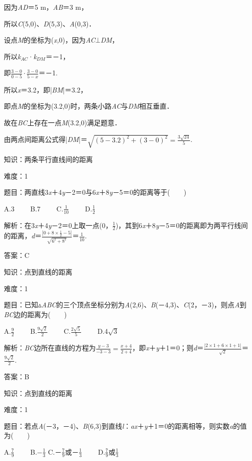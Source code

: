 \documentclass{article} %
\begin{document}
因为\textit{AD}＝5 m，\textit{AB}＝3 m，

所以\textit{C}(5,0)、\textit{D}(5,3)、\textit{A}(0,3)．

设点\textit{M}的坐标为(\textit{x,}0)，因为\textit{AC}$\mathrm{\bot}$\textit{DM}，

所以\textit{k${}_{AC}$}·\textit{k${}_{DM}$}＝－1，

即$\frac{3-0}{0-5}\cdot\frac{3-0}{5-x}$＝－1.

所以\textit{x}＝3.2，即|\textit{BM}|＝3.2，

即点\textit{M}的坐标为(3.2,0)时，两条小路\textit{AC}与\textit{DM}相互垂直．

故在\textit{BC}上存在一点\textit{M}(3.2,0)满足题意．

由两点间距离公式得|\textit{DM}|＝$\sqrt{(5-3.2)^2+(3-0)^2}=\frac{3\sqrt{24}}{5}$.


知识：两条平行直线间的距离

难度：1

题目：两直线3\textit{x}＋4\textit{y}－2＝0与6\textit{x}＋8\textit{y}－5＝0的距离等于(　　)

A.3　　 B.7　　 C.$\frac{1}{10}$　　 D.$\frac{1}{2}$

解析：在3\textit{x}＋4\textit{y}－2＝0上取一点(0，$\frac{1}{2}$)，其到6\textit{x}＋8\textit{y}－5＝0的距离即为两平行线间的距离，\textit{d}＝$\frac{|0+8\times\frac{1}{2}-5|}{\sqrt{6^2+8^2}}$＝$\frac{1}{10}$.

答案：C

知识：点到直线的距离

难度：1

题目：已知$\mathrm{\vartriangle}$\textit{ABC}的三个顶点坐标分别为\textit{A}(2,6)、\textit{B}(－4,3)、\textit{C}(2，－3)，则点\textit{A}到\textit{BC}边的距离为(　　)

A.$\frac{9}{2}$　　 B.$\frac{9\sqrt{2}}{2}$　　 C.$\frac{2\sqrt{5}}{5}$　　 D.4$\sqrt{3}$

解析：\textit{BC}边所在直线的方程为$\frac{y-3}{-3-3}=\frac{x+4}{2+4}$，即\textit{x}＋\textit{y}＋1＝0；则\textit{d}＝$\frac{|2\times 1+6\times 1+1|}{\sqrt{2}}$＝$\frac{9\sqrt{2}}{2}$.

答案：B

知识：点到直线的距离

难度：1

题目：若点\textit{A}(－3，－4)、\textit{B}(6,3)到直线\textit{l}：\textit{ax}＋\textit{y}＋1＝0的距离相等，则实数\textit{a}的值为(　　)

A.$\frac{7}{9}$　　 B.$-\frac{1}{3}$ C.－$\frac{7}{9}$或－$\frac{1}{3}$　　 D.$\frac{7}{9}$或$\frac{1}{3}$
\end{document}
